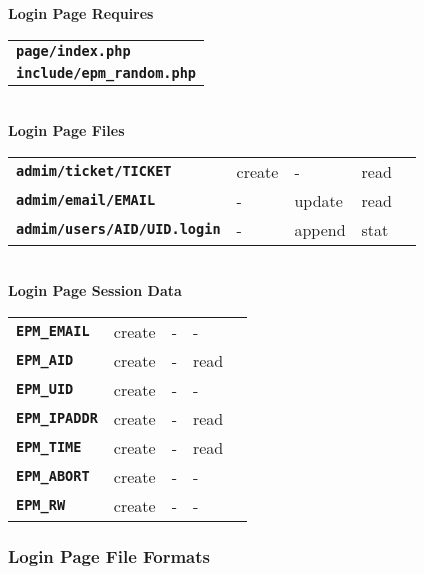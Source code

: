 \documentclass[12pt]{article}
\newcommand{\TT}[1]{{\tt \bfseries #1}}
\begin{document}
\begin{center}
{\bf Login Page Requires}
\\[1ex]
\begin{tabular}{l}
\TT{page/index.php} \\
\TT{include/epm\_random.php} \\
\end{tabular}
\\[3ex]
{\bf Login Page Files}
\\[1ex]
\begin{tabular}{lllll}
\TT{admim/ticket/TICKET}	& create  & -      & read \\
\TT{admim/email/EMAIL}	& -       & update & read \\
\TT{admim/users/AID/UID.login}
			& -       & append & stat \\
\end{tabular}
\\[3ex]
{\bf Login Page Session Data}
\\[1ex]
\begin{tabular}{lllll}
\TT{EPM\_EMAIL}	& create  & -      & - \\
\TT{EPM\_AID}	& create  & -      & read    \\
\TT{EPM\_UID}	& create  & -      & -    \\
\TT{EPM\_IPADDR}& create  & -      & read \\
\TT{EPM\_TIME}
                & create  & -      & read \\
\TT{EPM\_ABORT}
                & create  & -      & - \\
\TT{EPM\_RW}
                & create  & -      & - \\
\end{tabular}
\end{center}

\subsubsection{Login Page File Formats}
\end{document}
